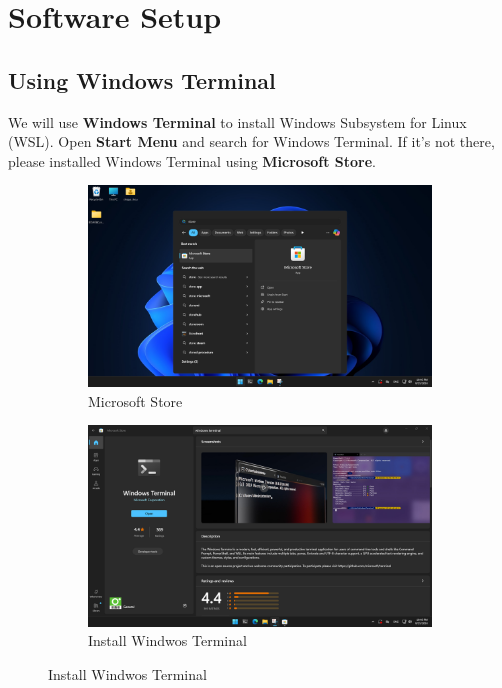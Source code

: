\section{Software Setup}
\subsection{Using Windows Terminal}
We will use {\bf Windows Terminal} to install Windows Subsystem for Linux (WSL). Open {\bf Start Menu} and search for Windows Terminal. If it's not there, please installed Windows Terminal using {\bf Microsoft Store}.
\begin{figure}[h]
    \centering
    \begin{subfigure}[h]{0.48\textwidth}
        \includegraphics[width=\textwidth]{./image/microsoft_store}
        \caption{Microsoft Store}
    \end{subfigure}
    \begin{subfigure}[h]{0.48\textwidth}
        \includegraphics[width=\textwidth]{./image/install_windows_terminal}
        \caption{Install Windwos Terminal}

\end{subfigure}
\end{figure}
